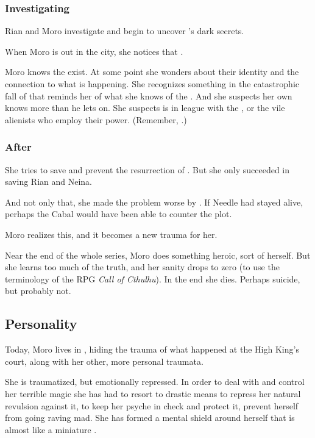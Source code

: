 \subsubsection{Investigating \Malcur}
Rian and Moro investigate and begin to uncover \Malcur's dark secrets. 

When Moro is out in the city, she notices that . 

Moro \Cornel knows the \xs exist. 
At some point she wonders about their identity and the connection to what is happening.
She recognizes something in the catastrophic fall of \Malcur that reminds her of what she knows of the \xs.
And she suspects her own \Nasshikerr knows more than he lets on. 
She suspects \Nasshikerr is in league with the \xs, or the vile alienists who employ their power.
(Remember, .)






\subsubsection{After \Malcur}
She tries to save \Malcur and prevent the resurrection of \Nithdornazsh. But she only succeeded in saving Rian and Neina. 

And not only that, she made the problem worse by . If Needle had stayed alive, perhaps the Cabal would have been able to counter the \Nithdornazsh{} plot. 

Moro realizes this, and it becomes a new trauma for her. 

Near the end of the whole series, Moro does something heroic, sort of  herself. But she learns too much of the truth, and her sanity drops to zero (to use the terminology of the RPG \emph{Call of Cthulhu}). In the end she dies. Perhaps suicide, but probably not. 









\subsection{Personality}
Today, Moro lives in \Malcur, hiding the trauma of what happened at the High King's court, along with her other, more personal traumata. 

She is traumatized, but emotionally repressed. In order to deal with and control her terrible \chaos{} magic she has had to resort to drastic means to repress her natural revulsion against it, to keep her psyche in check and protect it, prevent herself from going raving mad. She has formed a mental shield around herself that is almost like a miniature \Sephirah. 

